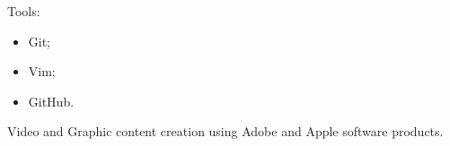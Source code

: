 \documentclass[english,a4paper]{europasscv}
\begin{document}
\begin{europasscv}
{\begin{ecvitemize}
{			            Tools:
			            \begin{itemize}
				            \item Git;
				            \item Vim;
				            \item GitHub.
			            \end{itemize}
			      }
			\item Video and Graphic content creation using Adobe and Apple
			software products.
		\end{ecvitemize}
	}
\end{europasscv}
\end{document}
